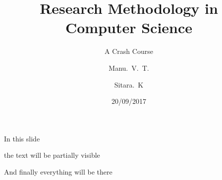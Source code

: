 \documentclass{beamer}
\title{Research Methodology in Computer Science}
\subtitle{A Crash Course}
\author{Manu.~V.~T.\inst{1} \and Sitara.~K\inst{2}}
\institute[VFU] %
{
	\inst{1}%
	IDRBT\\
	Hyderabad
	\and
	\inst{2}%
	SCIS\\
	University of Hyderabad
}
\date{20/09/2017}
\begin{document}
	\frame{\titlepage}

	
	
	
		\begin{frame}
		In this slide \pause
		
		the text will be partially visible \pause
		
		And finally everything will be there
	\end{frame}
	


	
\end{document}
